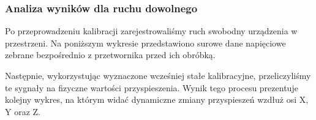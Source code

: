 \subsubsection{Analiza wyników dla ruchu dowolnego}
\akapit Po przeprowadzeniu kalibracji zarejestrowaliśmy ruch swobodny urządzenia w przestrzeni. Na poniższym wykresie przedstawiono surowe dane napięciowe zebrane bezpośrednio z przetwornika przed ich obróbką.

\akapit Następnie, wykorzystując wyznaczone wcześniej stałe kalibracyjne, przeliczyliśmy te sygnały na fizyczne wartości przyspieszenia. Wynik tego procesu prezentuje kolejny wykres, na którym widać dynamiczne zmiany przyspieszeń wzdłuż osi X, Y oraz Z.
